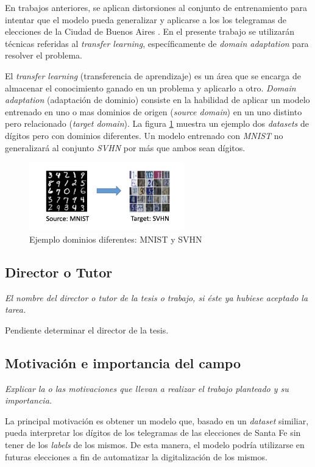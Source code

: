 \documentclass[a4paper, twoside]{report}
\begin{document}
En trabajos anteriores, se aplican distorsiones al conjunto de entrenamiento
para intentar que el modelo pueda generalizar y aplicarse a los los telegramas
de elecciones de la Ciudad de Buenos Aires \cite{Lamagna2016}. En el presente
trabajo se utilizar\'an t\'ecnicas referidas al {\it transfer learning},
espec\'ificamente de {\it domain adaptation} para resolver el problema.

El {\it transfer learning} (transferencia de aprendizaje) es un \'area que se
encarga de almacenar el conocimiento ganado en un problema y aplicarlo a otro.
	{\it Domain adaptation} (adaptaci\'on de dominio) consiste en la habilidad de
aplicar un modelo entrenado en uno o mas dominios de origen ({\it source
		domain}) en un uno distinto pero relacionado ({\it target domain}). La figura
\ref{fig:mnist-to-svhn} muestra un ejemplo dos {\it datasets} de d\'igitos pero
con dominios diferentes. Un modelo entrenado con {\it MNIST} no generalizar\'a
al conjunto {\it SVHN} por m\'as que ambos sean d\'igitos.

\begin{figure}[ht]
	\centering
	\includegraphics[width=0.6\textwidth]{mnist-to-svhn.png}
	\caption{Ejemplo dominios diferentes: MNIST y SVHN}
	\label{fig:mnist-to-svhn}
\end{figure}

\subsection*{Director o Tutor}
{\it El nombre del director o tutor de la tesis o trabajo, si éste ya
	hubiese aceptado la tarea.}

Pendiente determinar el director de la tesis.

\subsection*{Motivación e importancia del campo}
{\it Explicar la o las motivaciones que llevan a realizar el trabajo planteado
	y su importancia.}

La principal motivaci\'on es obtener un modelo que, basado en un {\it dataset}
similiar, pueda interpretar los d\'igitos de los telegramas de las elecciones
de Santa Fe sin tener de los {\it labels} de los mismos. De esta manera, el
modelo podr\'ia utilizarse en futuras elecciones a fin de automatizar la
digitalizaci\'on de los mismos.
\end{document}
